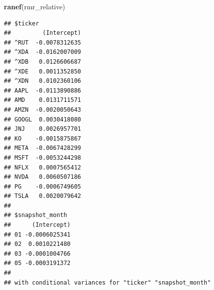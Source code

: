 \documentclass[
]{article}
\newenvironment{Shaded}{\begin{snugshade}}{\end{snugshade}}
\newcommand{\FunctionTok}[1]{\textcolor[rgb]{0.13,0.29,0.53}{\textbf{#1}}}
\newcommand{\NormalTok}[1]{#1}
\begin{document}
\begin{Shaded}
\begin{Highlighting}[]
\FunctionTok{ranef}\NormalTok{(rmr\_relative)}
\end{Highlighting}
\end{Shaded}

\begin{verbatim}
## $ticker
##         (Intercept)
## ^RUT  -0.0078312635
## ^XDA  -0.0162007009
## ^XDB   0.0126606687
## ^XDE   0.0011352850
## ^XDN   0.0102360106
## AAPL  -0.0113890886
## AMD    0.0131711571
## AMZN  -0.0020050643
## GOOGL  0.0030418080
## JNJ    0.0026957701
## KO    -0.0015875867
## META  -0.0067428299
## MSFT  -0.0053244298
## NFLX   0.0007565412
## NVDA   0.0060507186
## PG    -0.0006749605
## TSLA   0.0020079642
## 
## $snapshot_month
##      (Intercept)
## 01 -0.0006025341
## 02  0.0010221480
## 03 -0.0001004766
## 05 -0.0003191372
## 
## with conditional variances for "ticker" "snapshot_month"
\end{verbatim}
\end{document}
